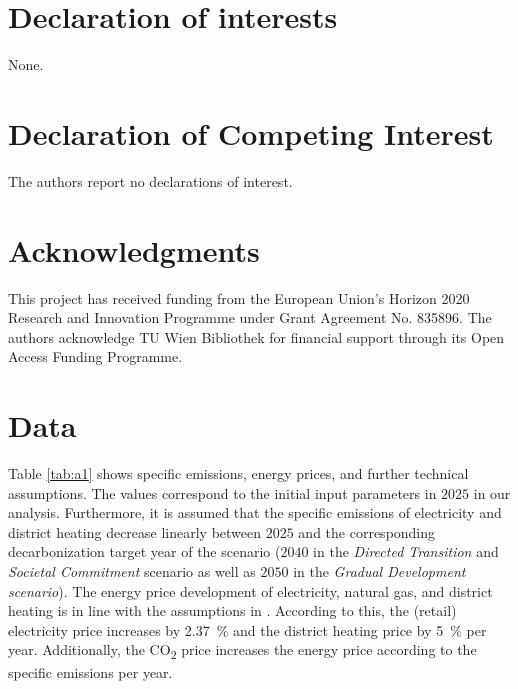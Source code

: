 \documentclass[review]{elsarticle}
\begin{document}






\section*{Declaration of interests}
None.
\section*{Declaration of Competing Interest}
The authors report no declarations of interest.
\section*{Acknowledgments}
This project has received funding from the European Union's Horizon 2020 Research and Innovation Programme under Grant Agreement No. 835896. The authors acknowledge TU Wien Bibliothek for financial support through its Open Access Funding Programme.


\appendix
\setcounter{table}{0}
\setcounter{figure}{0}
\newpage
\section{Data}\label{app:data}
Table \ref{tab:a1} shows specific emissions, energy prices, and further technical assumptions. The values correspond to the initial input parameters in $2025$ in our analysis. Furthermore, it is assumed that the specific emissions of electricity and district heating decrease linearly between $2025$ and the corresponding decarbonization target year of the scenario ($2040$ in the \textit{Directed Transition} and \textit{Societal Commitment} scenario as well as $2050$ in the \textit{Gradual Development scenario}). The energy price development of electricity, natural gas, and district heating is in line with the assumptions in \cite{fina2019profitability}. According to this, the (retail) electricity price increases by \SI{2.37}{\%} and the district heating price by \SI{5}{\%} per year. Additionally, the CO\textsubscript{2} price increases the energy price according to the specific emissions per year.
\end{document}
